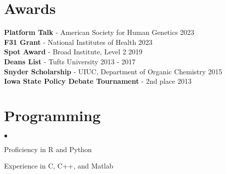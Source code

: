\documentclass[margin,line]{res}
\newenvironment{list2}{
  \begin{list}{$\bullet$}{%
      \setlength{\itemsep}{0in}
      \setlength{\parsep}{0in} \setlength{\parskip}{0in}
      \setlength{\topsep}{0in} \setlength{\partopsep}{0in} 
      \setlength{\leftmargin}{0.2in}}}{\end{list}}
\begin{document}
\begin{resume}
\section{Awards} 
{\bf Platform Talk} - American Society for Human Genetics \hfill 2023\\
{\bf F31 Grant} - National Institutes of Health \hfill  2023\\
{\bf Spot Award} - Broad Institute, Level 2 \hfill  2019\\
{\bf Deans List} - Tufts University \hfill  2013 - 2017\\
{\bf Snyder Scholarship} - UIUC, Department of Organic Chemistry \hfill 2015\\
{\bf Iowa State Policy Debate Tournament} - 2nd place \hfill  2013\\
\section{Programming} 
\begin{list2}
\item Proficiency in R and Python
\item Experience in C, C++, and Matlab
\end{list2}

\end{resume}
\end{document}
